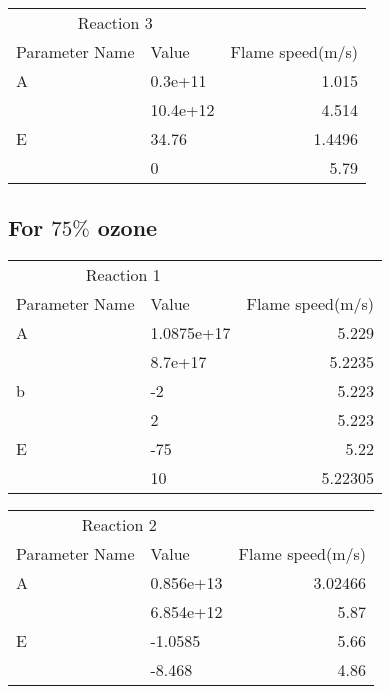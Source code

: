   
     \begin{tabular}{llr}  
    \toprule
    \multicolumn{2}{c}{Reaction 3} \\
    \cmidrule(r){1-2}
    Parameter Name  & Value &  Flame speed(m/s)\\
    \midrule
    A      & 0.3e+11    & 1.015     \\
           &  10.4e+12     & 4.514       \\
   
    E      & 34.76    & 1.4496      \\
           &   0     & 5.79       \\
    
    \bottomrule
  \end{tabular}
  
  
  
  
  
  \subsection{For $75\%$ ozone}
   \begin{tabular}{llr}  
    \toprule
    \multicolumn{2}{c}{Reaction 1} \\
    \cmidrule(r){1-2}
    Parameter Name  & Value & Flame speed(m/s)\\
    \midrule
    A      & 1.0875e+17    & 5.229     \\
           &  8.7e+17     & 5.2235       \\
    b      & -2    & 5.223     \\
           &    2     & 5.223       \\
    E      & -75    & 5.22      \\
           &   10     & 5.22305       \\
    
    \bottomrule
  \end{tabular}
  
   \begin{tabular}{llr}  
    \toprule
    \multicolumn{2}{c}{Reaction 2} \\
    \cmidrule(r){1-2}
    Parameter Name  & Value &  Flame speed(m/s)\\
    \midrule
    A      & 0.856e+13    & 3.02466      \\
           &  6.854e+12     & 5.87       \\
   
    E      & -1.0585    & 5.66      \\
           &   -8.468     & 4.86       \\
    
    \bottomrule
  \end{tabular}
  

